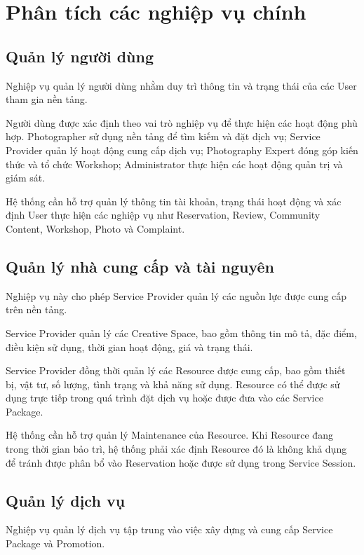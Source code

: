 \section{Phân tích các nghiệp vụ chính}

\subsection{Quản lý người dùng}

Nghiệp vụ quản lý người dùng nhằm duy trì thông tin và trạng thái của các User tham gia nền tảng.

Người dùng được xác định theo vai trò nghiệp vụ để thực hiện các hoạt động phù hợp. Photographer sử dụng nền tảng để tìm kiếm và đặt dịch vụ; Service Provider quản lý hoạt động cung cấp dịch vụ; Photography Expert đóng góp kiến thức và tổ chức Workshop; Administrator thực hiện các hoạt động quản trị và giám sát.

Hệ thống cần hỗ trợ quản lý thông tin tài khoản, trạng thái hoạt động và xác định User thực hiện các nghiệp vụ như Reservation, Review, Community Content, Workshop, Photo và Complaint.

\subsection{Quản lý nhà cung cấp và tài nguyên}

Nghiệp vụ này cho phép Service Provider quản lý các nguồn lực được cung cấp trên nền tảng.

Service Provider quản lý các Creative Space, bao gồm thông tin mô tả, đặc điểm, điều kiện sử dụng, thời gian hoạt động, giá và trạng thái.

Service Provider đồng thời quản lý các Resource được cung cấp, bao gồm thiết bị, vật tư, số lượng, tình trạng và khả năng sử dụng. Resource có thể được sử dụng trực tiếp trong quá trình đặt dịch vụ hoặc được đưa vào các Service Package.

Hệ thống cần hỗ trợ quản lý Maintenance của Resource. Khi Resource đang trong thời gian bảo trì, hệ thống phải xác định Resource đó là không khả dụng để tránh được phân bổ vào Reservation hoặc được sử dụng trong Service Session.

\subsection{Quản lý dịch vụ}

Nghiệp vụ quản lý dịch vụ tập trung vào việc xây dựng và cung cấp Service Package và Promotion.

